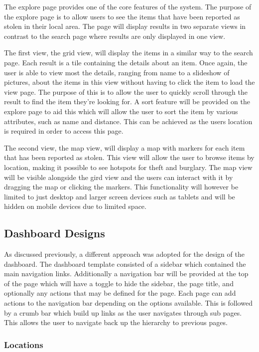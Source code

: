 The explore page provides one of the core features of the system. The purpose of the explore page is to allow users to see the items that have been reported as stolen in their local area. The page will display results in two separate views in contrast to the search page where results are only displayed in one view.

The first view, the grid view, will display the items in a similar way to the search page. Each result is a tile containing the details about an item. Once again, the user is able to view most the details, ranging from name to a slideshow of pictures, about the items in this view without having to click the item to load the view page. The purpose of this is to allow the user to quickly scroll through the result to find the item they're looking for. A sort feature will be provided on the explore page to aid this which will allow the user to sort the item by various attributes, such as name and distance. This can be achieved as the users location is required in order to access this page.

The second view, the map view, will display a map with markers for each item that has been reported as stolen. This view will allow the user to browse items by location, making it possible to see hotspots for theft and burglary. The map view will be visible alongside the gird view and the users can interact with it by dragging the map or clicking the markers. This functionality will however be limited to just desktop and larger screen devices such as tablets and will be hidden on mobile devices due to limited space.

\subsection{Dashboard Designs}
As discussed previously, a different approach was adopted for the design of the dashboard. The dashboard template consisted of a sidebar which contained the main navigation links. Additionally a navigation bar will be provided at the top of the page which will have a toggle to hide the sidebar, the page title, and optionally any actions that may be defined for the page. Each page can add actions to the navigation bar depending on the options available. This is followed by a crumb bar which build up links as the user navigates through sub pages. This allows the user to navigate back up the hierarchy to previous pages.

\subsubsection{Locations}


